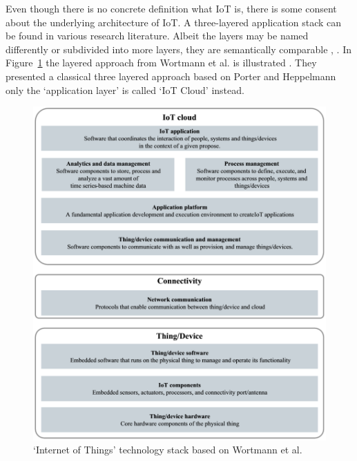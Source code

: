 	Even though there is no concrete definition what IoT is, there is some consent about the underlying architecture of IoT. A three-layered application stack can be found in various research literature. Albeit the layers may be named differently or subdivided into more layers, they are semantically comparable \cite{fleisch} \cite{ju}, \cite{wortmann}. In Figure~\ref{fig:wortmann_stack} the layered approach from Wortmann et al. is illustrated \cite{wortmann}. They presented a classical three layered approach based on Porter and Heppelmann  only the `application layer' is called `IoT Cloud' instead.

	\begin{figure}[ht]
	    \begin{center}
	    \includegraphics[scale=0.55]{Talk11/wortmann_stack.png}
	    \end{center}
	    \caption{`Internet of Things' technology stack based on Wortmann et al. \cite{} }
	    \label{fig:wortmann_stack}
    \end{figure}
	
